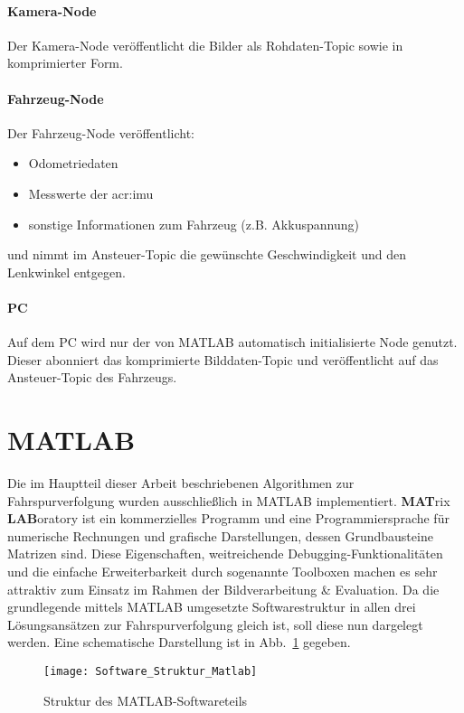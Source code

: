 \paragraph{Kamera-Node}
Der Kamera-Node veröffentlicht die Bilder als Rohdaten-Topic sowie in komprimierter Form.
\paragraph{Fahrzeug-Node}
Der Fahrzeug-Node veröffentlicht:
\begin{itemize}
\item Odometriedaten 
\item Messwerte der \gls{acr:imu}
\item sonstige Informationen zum Fahrzeug (z.B. Akkuspannung)
\end{itemize}
und nimmt im Ansteuer-Topic die gewünschte Geschwindigkeit und den Lenkwinkel entgegen.
\paragraph{PC}
Auf dem PC wird nur der von MATLAB automatisch initialisierte Node genutzt. Dieser abonniert das komprimierte Bilddaten-Topic und veröffentlicht auf das Ansteuer-Topic des Fahrzeugs.

\section{MATLAB \dcsecondauthorshort}
Die im Hauptteil dieser Arbeit beschriebenen Algorithmen zur Fahrspurverfolgung wurden ausschließlich in MATLAB implementiert. \textbf{MAT}rix \textbf{LAB}oratory ist ein kommerzielles Programm und eine Programmiersprache für numerische Rechnungen und grafische Darstellungen, dessen Grundbausteine Matrizen sind. Diese Eigenschaften, weitreichende Debugging-Funktionalitäten und die einfache Erweiterbarkeit durch sogenannte Toolboxen machen es sehr attraktiv zum Einsatz im Rahmen der Bildverarbeitung \& Evaluation. Da die grundlegende mittels MATLAB umgesetzte Softwarestruktur in allen drei Lösungsansätzen zur Fahrspurverfolgung gleich ist, soll diese nun dargelegt werden. Eine schematische Darstellung ist in Abb.~\ref{fig:software_struktur:matlab} gegeben.

\begin{figure}[htbp]
	\centering
	\texttt{[image: Software\_Struktur\_Matlab]}
	\caption{Struktur des MATLAB-Softwareteils}
	\label{fig:software_struktur:matlab}
\end{figure}

